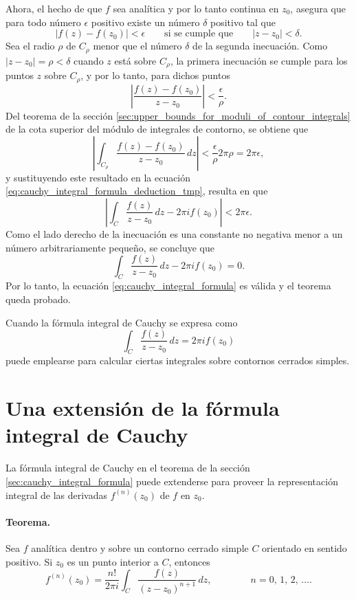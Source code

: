 \documentclass[a4paper]{report}
\begin{document}
Ahora, el hecho de que \(f\) sea analítica y por lo tanto continua en \(z_0\), asegura que para todo número \(\epsilon\) positivo existe un número \(\delta\) positivo tal que
\[
 |f(z)-f(z_0)|<\epsilon
 \qquad\textrm{si se cumple que}\qquad
 |z-z_0|<\delta.
\]
Sea el radio \(\rho\) de \(C_\rho\) menor que el número \(\delta\) de la segunda inecuación. Como \(|z-z_0|=\rho<\delta\) cuando \(z\) está sobre \(C_\rho\), la primera inecuación se cumple para los puntos \(z\) sobre \(C_\rho\), y por lo tanto, para dichos puntos
\[
 \left|\frac{f(z)-f(z_0)}{z-z_0}\right|<\frac{\epsilon}{\rho}.
\]
Del teorema de la sección \ref{sec:upper_bounds_for_moduli_of_contour_integrals} de la cota superior del módulo de integrales de contorno, se obtiene que 
\[
 \left|\int_{C_\rho}\frac{f(z)-f(z_0)}{z-z_0}\,dz\right|<\frac{\epsilon}{\rho}2\pi\rho=2\pi\epsilon,
\]
y sustituyendo este resultado en la ecuación \ref{eq:cauchy_integral_formula_deduction_tmp}, resulta en que 
\[
 \left|\int_C\frac{f(z)}{z-z_0}\,dz-2\pi if(z_0)\right|<2\pi\epsilon.
\]
Como el lado derecho de la inecuación es una constante no negativa menor a un número arbitrariamente pequeño, se concluye que 
\[
 \int_C\frac{f(z)}{z-z_0}\,dz-2\pi if(z_0)=0.
\]
Por lo tanto, la ecuación \ref{eq:cauchy_integral_formula} es válida y el teorema queda probado.

Cuando la fórmula integral de Cauchy se expresa como
\[
 \int_C\frac{f(z)}{z-z_0}\,dz=2\pi if(z_0)
\]
puede emplearse para calcular ciertas integrales sobre contornos cerrados simples.

\section{Una extensión de la fórmula integral de Cauchy}\label{sec:cauchy_integral_formula_extension}

La fórmula integral de Cauchy en el teorema de la sección \ref{sec:cauchy_integral_formula} puede extenderse para proveer la representación integral de las derivadas \(f^{(n)}(z_0)\) de \(f\) en \(z_0\).

\paragraph{Teorema.} Sea \(f\) analítica dentro y sobre un contorno cerrado simple \(C\) orientado en sentido positivo. Si \(z_0\) es un punto interior a \(C\), entonces
\begin{equation}\label{eq:cauchy_integral_formula_extension}
 f^{(n)}(z_0)=\frac{n!}{2\pi i}\int_{C}\frac{f(z)}{(z-z_0)^{n+1}}\,dz,
 \qquad\qquad 
 n=0,\,1,\,2,\,\dots. 
\end{equation}
\end{document}
